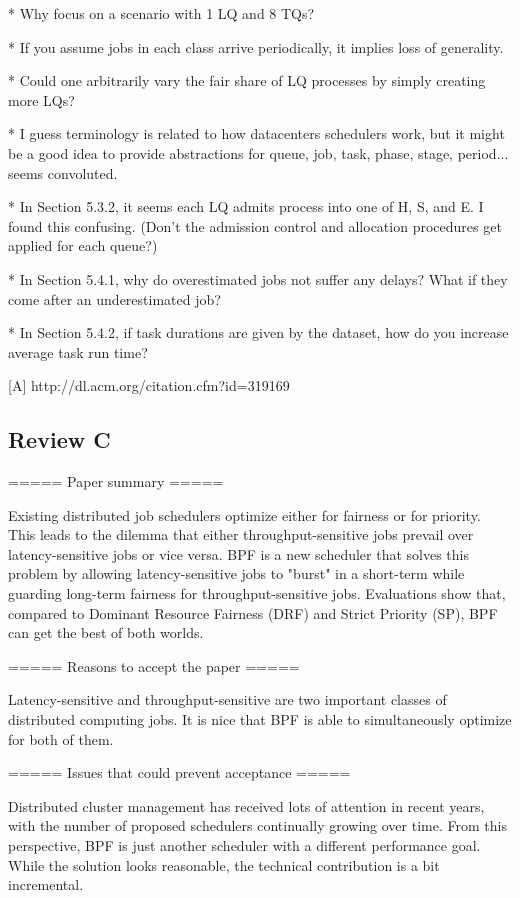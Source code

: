 * Why focus on a scenario with 1 LQ and 8 TQs?

* If you assume jobs in each class arrive periodically, it implies
loss of generality.

* Could one arbitrarily vary the fair share of LQ processes by
simply creating more LQs?

* I guess terminology is related to how datacenters schedulers work,
but it might be a good idea to provide abstractions for queue,
job, task, phase, stage, period...  seems convoluted.

* In Section 5.3.2, it seems each LQ admits process into one of H,
S, and E.  I found this confusing.  (Don't the admission control
and allocation procedures get applied for each queue?)

* In Section 5.4.1, why do overestimated jobs not suffer any
delays?  What if they come after an underestimated job?

* In Section 5.4.2, if task durations are given by the dataset, how
do you increase average task run time?

[A] http://dl.acm.org/citation.cfm?id=319169

\subsection{Review C}

 ===== Paper summary =====
 
 Existing distributed job schedulers optimize either for fairness or for priority. This leads to the dilemma that either throughput-sensitive jobs prevail over latency-sensitive jobs or vice versa. BPF is a new scheduler that solves this problem by allowing latency-sensitive jobs to "burst" in a short-term while guarding long-term fairness for throughput-sensitive jobs. Evaluations show that, compared to Dominant Resource Fairness (DRF) and Strict Priority (SP), BPF can get the best of both worlds.
 
 ===== Reasons to accept the paper =====
 
 Latency-sensitive and throughput-sensitive are two important classes of distributed computing jobs. It is nice that BPF is able to simultaneously optimize for both of them.
 
 ===== Issues that could prevent acceptance =====
 
 Distributed cluster management has received lots of attention in recent years, with the number of proposed schedulers continually growing over time. From this perspective, BPF is just another scheduler with a different performance goal. While the solution looks reasonable, the technical contribution is a bit incremental.
 
